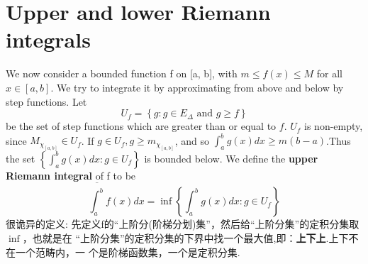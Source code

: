 \documentclass[12pt]{book}
\theoremstyle{definition}\newtheorem{dfn}{Définition}[chapter]
\theoremstyle{plain}\newtheorem{thm}{Théorème}[chapter]
\theoremstyle{plain}\newtheorem{prp}{Proposition}[chapter]
\theoremstyle{plain}\newtheorem{lem}{\bf Lemme}[chapter]
\theoremstyle{plain}\newtheorem{axm}{\bf Axiome}[chapter]
\theoremstyle{plain}\newtheorem{lmm}{\bf Lemme}[chapter]
\theoremstyle{plain}\newtheorem{exm}{\bf Example}[chapter]
\theoremstyle{plain}\newtheorem{cor}{\bf Corollaire}[chapter]
\theoremstyle{remark}\newtheorem{rem}{Remarque}[chapter]
\begin{document}
\section{Upper and lower Riemann integrals}
We now consider a bounded function f on [a, b], with $m \le f(x) \le M$ for all
$x \in [a, b].$  We try to integrate it by approximating from above and below by
step functions. Let
$$U_f = \left\{g : g \in E_{\Delta}\text{ and }g \ge f\right\}$$
be the set of step functions which are greater than or equal to $f$. $U_f$ is
non-empty, since $M_{\chi_{[a,b]}} \in U_f$. If $g \in U_f, g \ge m_{\chi_{[a,b]}}$, and so
$\int_{a}^{b}g(x) dx \ge m(b-a)$.Thus the set $\left\{\int^b_a g(x) dx : g \in U_f\right\}$ is bounded below. We define
the {\bf upper Riemann integral} of f to be
$$
\overline{\int^b_a}f(x)d x=\inf\left\{\int^b_a g(x) dx : g \in U_f\right\}
$$
很诡异的定义: 先定义f的“上阶分(阶梯分划)集”，然后给“上阶分集”的定积分集取$\inf$，也就是在
“上阶分集”的定积分集的下界中找一个最大值,即：{\bf 上下上}.上下不在一个范畴内，一
个是阶梯函数集，一个是定积分集.
\end{document}
